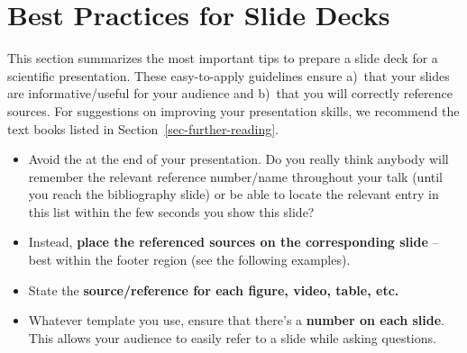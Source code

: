 \documentclass[11pt,a4paper]{article}
\begin{document}
\newpage
\section{Best Practices for Slide Decks}
\label{sec-presentations}
This section summarizes the most important tips to prepare a slide deck for a scientific presentation.
These easy-to-apply guidelines ensure a)~that your slides are informative/useful for your audience and b)~that you will correctly reference sources. 
For suggestions on improving your presentation skills, we recommend the text books listed in Section~\ref{sec-further-reading}.

\begin{itemize}
  \item Avoid the  at the end of your presentation. Do you really think anybody will remember the relevant reference number/name throughout your talk (until you reach the bibliography slide) or be able to locate the relevant entry in this list within the few seconds you show this slide?
  \item Instead, \textbf{place the referenced sources on the corresponding slide} -- best within the footer region (see the following examples).
  \item State the \textbf{source/reference for each figure, video, table, etc.}
  \item Whatever template you use, ensure that there's a \textbf{number on each slide}. This allows your audience to easily refer to a slide while asking questions.
\end{itemize}
\end{document}
